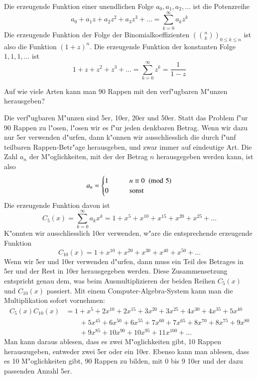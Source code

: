 Die erzeugende Funktion einer unendlichen Folge $a_0,a_1,a_2,\dots$ ist
die Potenzreihe
\[
a_0+a_1z+a_2z^2+a_3z^3+\dots=\sum_{k=0}^\infty a_kz^k
\]
Die erzeugende Funktion der Folge der Binomialkoeffizienten $\left(\binom{n}{k}\right)_{0\le k\le  n}$ ist also die Funktion $(1+z)^n$.
Die erzeugende Funktion der konstanten Folge $1,1,1,\dots$ ist
\[
1+z+z^2+z^3+\dots=\sum_{k=0}^\infty z^k=\frac1{1-z}
\]

\begin{beispiele}
\item 
Auf wie viele Arten kann man 90 Rappen mit den verf"ugbaren M"unzen
herausgeben?

Die verf"ugbaren M"unzen sind 5er, 10er, 20er und 50er.
Statt das Problem f"ur 90 Rappen zu l"osen, l"osen wir es f"ur jeden
denkbaren Betrag.
Wenn wir dazu nur 5er verwenden d"urfen, dann k"onnen wir ausschliesslich
die durch f"unf teilbaren Rappen-Betr"age herausgeben, und zwar immer
auf eindeutige Art.
Die Zahl $a_n$ der M"oglichkeiten, mit der der Betrag
$n$ herausgegeben werden kann, ist also
\[
a_n = \begin{cases}
1&\qquad n\equiv 0\imod{5}\\
0&\qquad \text{sonst}
\end{cases}
\]
Die erzeugende Funktion davon ist
\[
C_5(x)=\sum_{k=0}^\infty a_kx^k=1+x^5+x^{10}+x^{15}+x^{20}+x^{25}+\dots
\]
K"onnten wir ausschliesslich 10er verwenden, w"are die entsprechende
erzeugende Funktion
\[
C_{10}(x)=1+x^{10}+x^{20}+x^{30}+x^{40}+x^{50}+\dots
\]
Wenn wir 5er und 10er verwenden d"urfen, dann muss ein Teil des Betrages
in 5er und der Rest in 10er herausgegeben werden.
Diese Zusammensetzung entspricht genau dem, was beim Ausmultiplizieren
der beiden Reihen $C_5(x)$ und $C_{10}(x)$ passiert.
Mit einem Computer-Algebra-System kann man die Multiplikation sofort vornehmen:
\begin{align*}
C_5(x)C_{10}(x)&=
 1+x^5+2 x^{10}+2 x^{15}+3 x^{20}+3 x^{25}+4 x^{30}+4 x^{35}+5 x^{40}\\
&\qquad +5 x^{45} +6 x^{50}+6 x^{55}+7 x^{60}+7 x^{65}+8 x^{70}+8 x^{75}+9 x^{80}\\
&\qquad +9 x^{85}+10 x^{90}+10 x^{95}+11 x^{100}+\dots
\end{align*}
Man kann daraus ablesen, dass es zwei M"oglichkeiten gibt, 10 Rappen
herauszugeben, entweder zwei 5er oder ein 10er.
Ebenso kann man ablesen,
dass es 10 M"oglichkeiten gibt, 90 Rappen zu bilden, mit 0 bis 9 10er
und der dazu passenden Anzahl 5er.


\end{beispiele}
